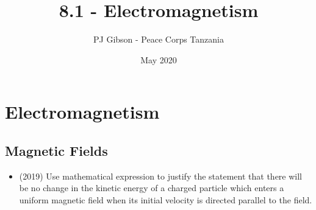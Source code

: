 \documentclass{article}
\title{8.1 - Electromagnetism}
\author{PJ Gibson - Peace Corps Tanzania}
\date{May 2020}
\begin{document}
\maketitle


\section{Electromagnetism}

\subsection{Magnetic Fields}
\begin{itemize}
\item (2019)  Use mathematical expression to justify the statement that there will be no change in the kinetic energy of a charged particle which enters a uniform magnetic field when its initial velocity is directed parallel to the field.

\end{itemize}
\end{document}
